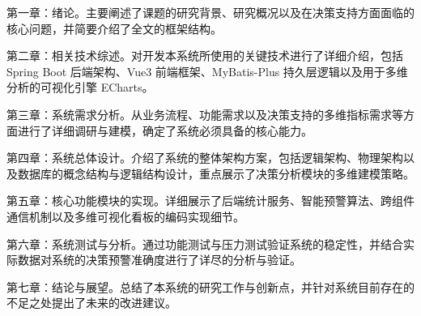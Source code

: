 第一章：绪论。主要阐述了课题的研究背景、研究概况以及在决策支持方面面临的核心问题，并简要介绍了全文的框架结构。

第二章：相关技术综述。对开发本系统所使用的关键技术进行了详细介绍，包括 Spring Boot 后端架构、Vue3 前端框架、MyBatis-Plus 持久层逻辑以及用于多维分析的可视化引擎 ECharts。

第三章：系统需求分析。从业务流程、功能需求以及决策支持的多维指标需求等方面进行了详细调研与建模，确定了系统必须具备的核心能力。

第四章：系统总体设计。介绍了系统的整体架构方案，包括逻辑架构、物理架构以及数据库的概念结构与逻辑结构设计，重点展示了决策分析模块的多维建模策略。

第五章：核心功能模块的实现。详细展示了后端统计服务、智能预警算法、跨组件通信机制以及多维可视化看板的编码实现细节。

第六章：系统测试与分析。通过功能测试与压力测试验证系统的稳定性，并结合实际数据对系统的决策预警准确度进行了详尽的分析与验证。

第七章：结论与展望。总结了本系统的研究工作与创新点，并针对系统目前存在的不足之处提出了未来的改进建议。
